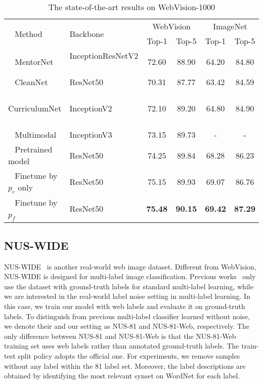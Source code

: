 \documentclass[sigconf]{acmart}
\begin{document}
\setlength{\tabcolsep}{1pt}
\begin{table}
	\centering
	\caption{The state-of-the-art results on WebVision-1000}
	\label{tab:web1000}
	\begin{tabular}{llcccc}
		\toprule
		\multicolumn{1}{l}{\multirow{2}{*}{~ Method}}  & \multicolumn{1}{l}{\multirow{2}{*}{Backbone}} & \multicolumn{2}{c}{WebVision} & \multicolumn{2}{c}{ImageNet} \\
		& \multicolumn{1}{c}{} & \multicolumn{1}{c}{Top-1} & \multicolumn{1}{c}{Top-5} & \multicolumn{1}{c}{Top-1} & \multicolumn{1}{c}{Top-5} \\
		\midrule
~ MentorNet \cite{jiang2017mentornet} &InceptionResNetV2 ~ &72.60&88.90&64.20&84.80\\
		~ CleanNet \cite{lee2018cleannet} &ResNet50&70.31&87.77&63.42&84.59\\
		~ CurriculumNet \cite{guo2018curriculumnet} ~ &InceptionV2&72.10&89.20&64.80&84.90\\
		~ Multimodal \cite{shah2019inferring} & InceptionV3&73.15&89.73&-&-\\
\midrule
		~ Pretrained model      ~ & ResNet50 &74.25&89.84&68.28&86.23\\
		~ Finetune by $p_c$ only~ & ResNet50 &75.15&89.93&69.07&86.76\\
		~ Finetune by $p_f$     ~ & ResNet50 &\textbf{75.48}&\textbf{90.15}&\textbf{69.42}&\textbf{87.29}\\
		\bottomrule
	\end{tabular}
\end{table}

\subsection{NUS-WIDE}
NUS-WIDE~\cite{nus-wide-civr09} is another real-world web image dataset. Different from WebVision, NUS-WIDE is designed for multi-label image classification.
Previous works~\cite{Wang2016cnnrnn,Zhu_2017_CVPR} only use the dataset with ground-truth labels for standard multi-label learning, while we are interested in the real-world label noise setting in multi-label learning. In this case, we train our model with web labels and evaluate it on ground-truth labels.
To distinguish from previous multi-label classifier learned without noise, we denote their and our setting as NUS-81 and NUS-81-Web, respectively. The only difference between NUS-81 and NUS-81-Web is that the NUS-81-Web training set uses web labels rather than annotated ground-truth labels. The train-test split policy adopts the official one.
For experiments, we remove samples without any label within the 81 label set. Moreover, the label descriptions are obtained by identifying the most relevant synset on WordNet for each label.
\end{document}
